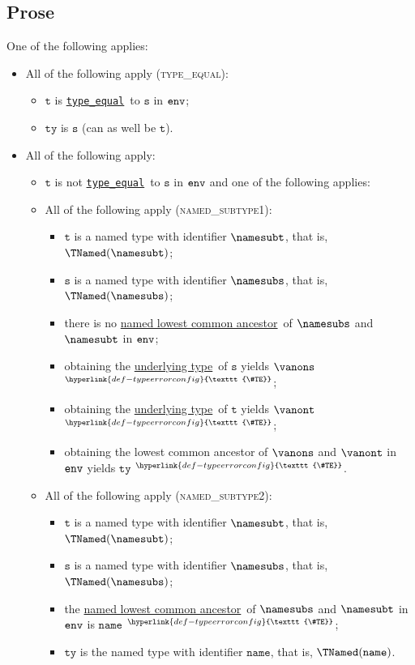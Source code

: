 \documentclass{book}
\newcommand\TypeErrorConfig[0]{\hyperlink{def-typeerrorconfig}{\texttt{\#TE}}}
\newcommand\ProseOrTypeError[0]{\hyperlink{def-proseortypeerror}{$^{\TypeErrorConfig}$}}
\newcommand\typeequal[0]{\hyperlink{def-typeequal}{\texttt{type\_equal}}}
\newcommand\underlyingtype[0]{\hyperlink{def-underlyingtype}{underlying type}}
\newcommand\namedlowestcommonancestor[0]{\hyperlink{def-namedlowestcommonancestor}{named lowest common ancestor}}
\newcommand\vt[0]{\texttt{t}}
\newcommand\vs[0]{\texttt{s}}
\newcommand\tty[0]{\texttt{ty}}
\newcommand\name[0]{\texttt{name}}
\begin{document}
\subsection{Prose}
One of the following applies:
\begin{itemize}
  \item All of the following apply (\textsc{type\_equal}):
  \begin{itemize}
    \item $\vt$ is \typeequal\ to $\vs$ in $\texttt{env}$;
    \item $\tty$ is $\vs$ (can as well be $\vt$).
  \end{itemize}

  \item All of the following apply:
  \begin{itemize}
    \item $\vt$ is not \typeequal\ to $\vs$ in $\texttt{env}$ and one of the following applies:

    \item All of the following apply (\textsc{named\_subtype1}):
    \begin{itemize}
      \item $\vt$ is a named type with identifier $\namesubt$, that is, $\TNamed(\namesubt)$;
      \item $\vs$ is a named type with identifier $\namesubs$, that is, $\TNamed(\namesubs)$;
      \item there is no \namedlowestcommonancestor\ of $\namesubs$ and $\namesubt$ in $\texttt{env}$;
      \item obtaining the \underlyingtype\ of $\vs$ yields $\vanons$ \ProseOrTypeError;
      \item obtaining the \underlyingtype\ of $\vt$ yields $\vanont$ \ProseOrTypeError;
      \item obtaining the lowest common ancestor of $\vanons$ and $\vanont$ in $\texttt{env}$ yields $\tty$ \ProseOrTypeError.
    \end{itemize}

    \item All of the following apply (\textsc{named\_subtype2}):
    \begin{itemize}
      \item $\vt$ is a named type with identifier $\namesubt$, that is, $\TNamed(\namesubt)$;
      \item $\vs$ is a named type with identifier $\namesubs$, that is, $\TNamed(\namesubs)$;
      \item the \namedlowestcommonancestor\ of $\namesubs$ and $\namesubt$ in $\texttt{env}$ is $\name$ \ProseOrTypeError;
      \item $\tty$ is the named type with identifier $\name$, that is, $\TNamed(\name)$.
    \end{itemize}


\end{itemize}
\end{itemize}
\end{document}
